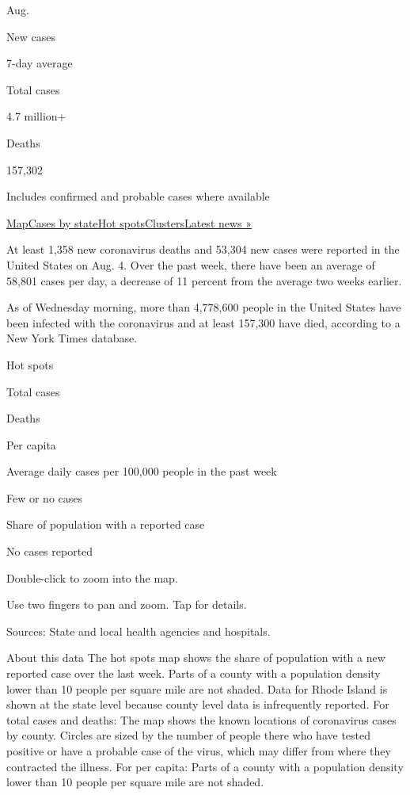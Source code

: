 Aug.

New cases

7-day average

Total cases

4.7 million+

Deaths

157,302

Includes confirmed and probable cases where available

\protect\hyperlink{map}{Map}\protect\hyperlink{states}{Cases by
state}\protect\hyperlink{hotspots}{Hot
spots}\protect\hyperlink{clusters}{Clusters}\href{https://www.nytimes.com/2020/08/04/world/coronavirus-covid-19.html}{Latest
news »}

At least 1,358 new coronavirus deaths and 53,304 new cases were reported
in the United States on Aug. 4. Over the past week, there have been an
average of 58,801 cases per day, a decrease of 11 percent from the
average two weeks earlier.

As of Wednesday morning, more than 4,778,600 people in the United States
have been infected with the coronavirus and at least 157,300 have died,
according to a New York Times database.

Hot spots

Total cases

Deaths

Per capita

Average daily cases per 100,000 people in the past week

Few or no cases

Share of population with a reported case

No cases reported

Double-click to zoom into the map.

Use two fingers to pan and zoom. Tap for details.

Sources: State and local health agencies and hospitals.

About this data The hot spots map shows the share of population with a
new reported case over the last week. Parts of a county with a
population density lower than 10 people per square mile are not shaded.
Data for Rhode Island is shown at the state level because county level
data is infrequently reported. For total cases and deaths: The map shows
the known locations of coronavirus cases by county. Circles are sized by
the number of people there who have tested positive or have a probable
case of the virus, which may differ from where they contracted the
illness. For per capita: Parts of a county with a population density
lower than 10 people per square mile are not shaded.

